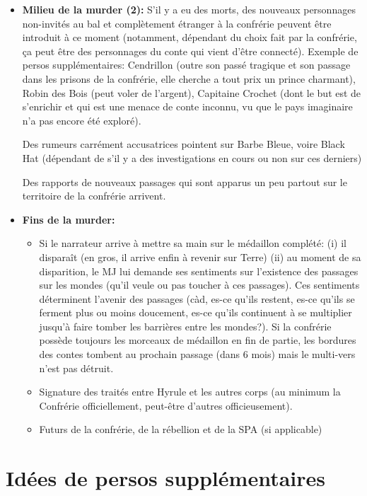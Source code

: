 {\begin{itemize}
		\item \textbf{Milieu de la murder (2):} S'il y a eu des morts, des nouveaux personnages non-invités au bal et complètement étranger à la confrérie peuvent être introduit à ce moment (notamment, dépendant du choix fait par la confrérie, ça peut être des personnages du conte qui vient d'être connecté). Exemple de persos supplémentaires: Cendrillon (outre son passé tragique et son passage dans les prisons de la confrérie, elle cherche a tout prix un prince charmant), Robin des Bois (peut voler de l'argent), Capitaine Crochet (dont le but est de s'enrichir et qui est une menace de conte inconnu, vu que le pays imaginaire n'a pas encore été exploré).
		
		Des rumeurs carrément accusatrices pointent sur Barbe Bleue, voire Black Hat (dépendant de s'il y a des investigations en cours ou non sur ces derniers)
		
		Des rapports de nouveaux passages qui sont apparus un peu partout sur le territoire de la confrérie arrivent.
		
		\item \textbf{Fins de la murder:}
		\begin{itemize}
			\item Si le narrateur arrive à mettre sa main sur le médaillon complété: (i) il disparaît (en gros, il arrive enfin à revenir sur Terre) (ii) au moment de sa disparition, le MJ lui demande ses sentiments sur l'existence des passages sur les mondes (qu'il veule ou pas toucher à ces passages). Ces sentiments déterminent l'avenir des passages (càd, es-ce qu'ils restent, es-ce qu'ils se ferment plus ou moins doucement, es-ce qu'ils continuent à se multiplier jusqu'à faire tomber les barrières entre les mondes?). Si la confrérie possède toujours les morceaux de médaillon en fin de partie, les bordures des contes tombent au prochain passage (dans 6 mois) mais le multi-vers n'est pas détruit.
			
			\item Signature des traités entre Hyrule et les autres corps (au minimum la Confrérie officiellement, peut-être d'autres officieusement).
			
			\item Futurs de la confrérie, de la rébellion et de la SPA (si applicable)
		\end{itemize}
	\end{itemize}
	
	
	\section{Idées de persos supplémentaires}
	
}
